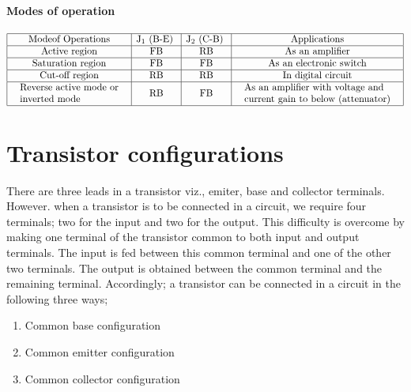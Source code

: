 \paragraph{Modes of operation}
 $$\begin{array}{|c|c|c|c|}
 	\hline \text { Modeof Operations } & \mathrm{J}_{1} \text { (B-E) } & \mathrm{J}_{2} \text { (C-B) } & \text { Applications } \\
 	\hline \text { Active region } & \text { FB } & \text { RB } & \text { As an amplifier } \\
 	\hline \text { Saturation region } & \text { FB } & \text { FB } & \text { As an electronic switch } \\
 	\hline \text { Cut-off region } & \text { RB } & \text { RB } & \text { In digital circuit } \\
 	\hline \begin{array}{l}
 		\text { Reverse active mode or } \\
 		\text { inverted mode }
 	\end{array} & \text { RB } & \text { FB } & \begin{array}{l}
 		\text { As an amplifier with voltage and } \\
 		\text { current gain to below (attenuator) }
 	\end{array} \\
 	\hline
 \end{array}$$
 \section{Transistor configurations}
 There are three leads in a transistor viz., emiter, base and collector terminals. However. when a transistor is to be connected in a circuit, we require four terminals; two for the input and two for the output. This difficulty is overcome by making one terminal of the transistor common to both input and output terminals. The input is fed between this common terminal and one of the other two terminals. The output is obtained between the common terminal and the remaining terminal. Accordingly; a transistor can be connected in a circuit in the following three ways;
 \begin{enumerate}
 	\item Common base configuration
 	\item Common emitter configuration
 	\item Common collector configuration
 \end{enumerate}

